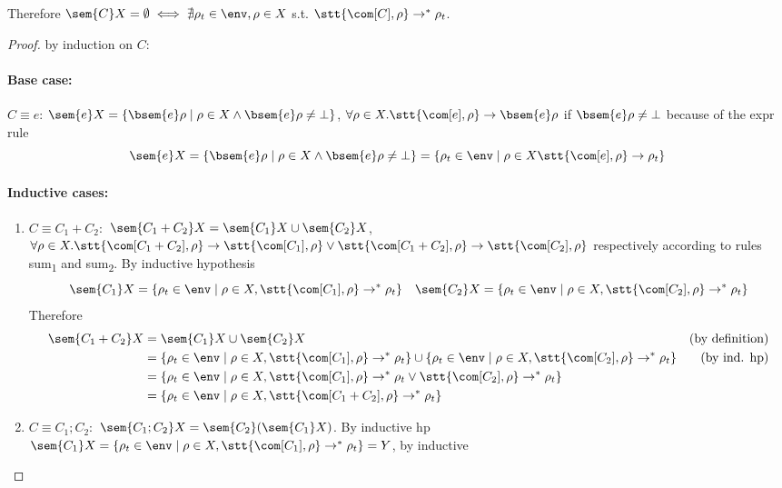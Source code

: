Therefore \(\sem{C}X = \emptyset \iff \nexists \rho_t \in \env, \rho
\in X\) s.t. \(\stt{\com[C], \rho} \to^* \rho_t\).

\begin{proof}
  by induction on \(C\):
  \paragraph*{Base case:\\}
   \(C \equiv e\): \(\sem{e}X = \{\bsem{e}\rho \mid \rho \in X \wedge
   \bsem{e}\rho \neq \bot \}\), \(\forall \rho \in X . \stt{\com[e],
     \rho} \to \bsem{e}\rho\) if \(\bsem{e}\rho \neq \bot\) because of
   the expr rule \[\sem{e}X = \{\bsem{e}\rho \mid \rho \in X \wedge
   \bsem{e}\rho \neq \bot \} = \{\rho_t \in\env \mid \rho \in X
   \stt{\com[e], \rho} \to \rho_t\}\]
  \paragraph*{Inductive cases:\\}
  \begin{enumerate}
  \item \(C \equiv C_1 + C_2:\) \(\sem{C_1 + C_2}X = \sem{C_1}X \cup
    \sem{C_2}X\), \(\forall \rho \in X . \stt{\com[C_1 + C_2], \rho} \to
    \stt{\com[C_1], \rho} \vee \stt{\com[C_1 + C_2], \rho} \to \stt{\com[C_2], \rho}\)
    respectively according to rules sum\textsubscript{1} and
    sum\textsubscript{2}. By inductive hypothesis \[\sem{C_1}X =
    \{\rho_t \in\env \mid \rho \in X , \stt{\com[C_1],\rho} \to^* \rho_t\} \quad
    \sem{C_2}X = \{\rho_t \in\env \mid \rho \in X , \stt{\com[C_2],\rho} \to^*
    \rho_t\}\] Therefore
    \begin{align*}
      \sem{C_1 + C_2}X & = \sem{C_1}X \cup \sem{C_2}X & \text{(by definition)}\\
      & = \{\rho_t \in\env \mid \rho \in X , \stt{\com[C_1],\rho} \to^* \rho_t\} \cup \{\rho_t \in\env \mid \rho \in X , \stt{\com[C_2],\rho} \to^* \rho_t\} & \text{(by ind. hp)}\\
      & = \{\rho_t \in\env \mid \rho \in X, \stt{\com[C_1],\rho} \to^* \rho_t \vee \stt{\com[C_2],\rho} \to^* \rho_t\} \\
      & = \{\rho_t \in\env \mid \rho \in X, \stt{\com[C_1 + C_2], \rho} \to^* \rho_t\}
    \end{align*}
  \item \(C \equiv C_1;C_2:\) \(\sem{C_1;C_2}X =
    \sem{C_2}(\sem{C_1}X)\). By inductive hp \(\sem{C_1}X = \{\rho_t
    \in\env \mid \rho \in X, \stt{\com[C_1], \rho} \to^* \rho_t\} = Y\), by inductive

\end{enumerate}
\end{proof}
